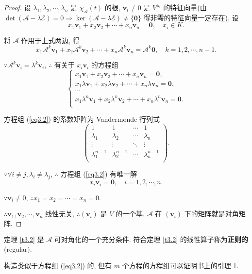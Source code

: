 \documentclass[color=black,device=normal,lang=cn,mode=geye]{elegantnote}
\begin{document}
\begin{proof}
    设 $\lambda_1,\lambda_2,\cdots,\lambda_n$ 是 $\chi_{\mathcal{A}}(t)$ 的根, $\boldsymbol{v}_i\neq0$ 是 $V^{\lambda_i}$ 的特征向量(由 $\det(\mathcal{A}-\lambda\mathcal{E})=0\Rightarrow\ker(\mathcal{A}-\lambda\mathcal{E})\neq\{\boldsymbol{0}\}$ 得非零的特征向量一定存在). 设
    \[x_1\boldsymbol{v}_1+x_2\boldsymbol{v}_2+\cdots+x_n\boldsymbol{v}_n=\boldsymbol{0},\quad x_i\in K.\]
    
    将 $\mathcal{A}$ 作用于上式两边, 得
    \[x_1\mathcal{A}^k\boldsymbol{v}_1+x_2\mathcal{A}^k\boldsymbol{v}_2+\cdots+x_n\mathcal{A}^k\boldsymbol{v}_n=\mathcal{A}^k\boldsymbol{0},\quad k=1,2,\cdots,n-1.\]

    $\because\mathcal{A}^k\boldsymbol{v}_i=\lambda^k\boldsymbol{v}_i$, $\therefore$ 有关于 $x_i\boldsymbol{v}_i$ 的方程组
    \begin{equation}\label{eq3.2}
        \begin{cases}
            x_1\boldsymbol{v}_1+x_2\boldsymbol{v}_2+\cdots+x_n\boldsymbol{v}_n=\boldsymbol{0}, \\
            x_1\lambda\boldsymbol{v}_1+x_2\lambda\boldsymbol{v}_2+\cdots+x_n\lambda\boldsymbol{v}_n=\boldsymbol{0}, \\
            \cdots \\
            x_1\lambda^n\boldsymbol{v}_1+x_2\lambda^n\boldsymbol{v}_2+\cdots+x_n\lambda^n\boldsymbol{v}_n=\boldsymbol{0}. \\
        \end{cases}
    \end{equation}
    
    方程组 (\ref{eq3.2}) 的系数矩阵为 Vandermonde 行列式
    \[\begin{pmatrix}
        1 & 1 & \cdots & 1 \\
        \lambda_1 & \lambda_2 & \cdots & \lambda_n \\
        \vdots & \vdots & \ddots & \vdots \\
        \lambda^{n-1}_1 & \lambda^{n-1}_2 & \cdots & \lambda^{n-1}_n \\
    \end{pmatrix}.\]

    $\because\forall i\neq j,\lambda_i\neq\lambda_j$, $\therefore$ 方程组 (\ref{eq3.2}) 有唯一解
    \[x_i\boldsymbol{v}_i=\boldsymbol{0},\quad i=1,2,\cdots,n.\]

    $\because\boldsymbol{v}_i\neq0$, $\therefore x_1=x_2=\cdots=x_n=0$.

    $\therefore\boldsymbol{v}_1,\boldsymbol{v}_2,\cdots,\boldsymbol{v}_n$ 线性无关, $\therefore(\boldsymbol{v}_i)$ 是 $V$ 的一个基. $\mathcal{A}$ 在 $(\boldsymbol{v}_i)$ 下的矩阵就是对角矩阵.
\end{proof}
定理 \ref{t3.2} 是 $\mathcal{A}$ 可对角化的一个充分条件. 符合定理 \ref{t3.2} 的线性算子称为\textbf{正则的}(regular).
\begin{note}
    构造类似于方程组 (\ref{eq3.2}) 的, 但有 $m$ 个方程的方程组可以证明书上的引理 1.
\end{note}
\end{document}
